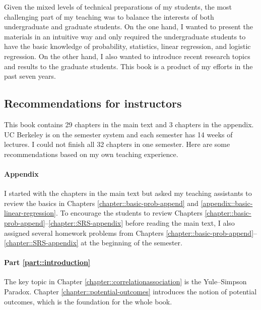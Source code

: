 Given the mixed levels of technical preparations of my students, the most challenging part of my teaching was to balance the interests of both undergraduate and graduate students. On the one hand, I wanted to present the materials in an intuitive way and only required the undergraduate students to have the basic knowledge of probability, statistics, linear regression, and logistic regression. On the other hand, I also wanted to introduce recent research topics and results to the graduate students. This book is a product of my efforts in the past seven years.  



\subsection*{Recommendations for instructors}



This book contains 29 chapters in the main text and 3 chapters in the appendix.  UC Berkeley is on the semester system and each semester has 14 weeks of lectures. I could not finish all 32 chapters in one semester.  Here are some recommendations based on my own teaching experience.


\paragraph*{Appendix}
I started with the chapters in the main text but asked my teaching assistants to review the basics in Chapters \ref{chapter::basic-prob-append} and \ref{appendix::basic-linear-regression}.  To encourage the students to review Chapters \ref{chapter::basic-prob-append}--\ref{chapter::SRS-appendix} before reading the main text, I also assigned several homework problems from Chapters \ref{chapter::basic-prob-append}--\ref{chapter::SRS-appendix} at the beginning of the semester.



\paragraph*{Part \ref{part::introduction}}
The key topic in Chapter \ref{chapter::correlationassociation} is the Yule--Simpson Paradox.  Chapter \ref{chapter::potential-outcomes} introduces the notion of potential outcomes, which is the foundation for the whole book. 



